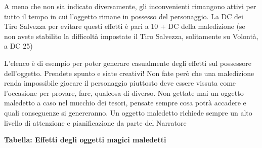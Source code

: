 \begin{multicols}{2}
A meno che non sia indicato diversamente, gli inconvenienti rimangono attivi per tutto il tempo in cui l'oggetto rimane in possesso del personaggio. La DC dei Tiro Salvezza per evitare questi effetti è pari a 10 + DC della maledizione (se non avete stabilito la difficoltà impostate il Tiro Salvezza, solitamente su Volontà, a DC 25)

\end{multicols}

\medskip

\begin{changemargin}{0.3cm}{0.3cm}\begin{narratore}L'elenco è di esempio per poter generare casualmente degli effetti sul possessore dell'oggetto. Prendete spunto e siate creativi!  Non fate però che una maledizione renda impossibile giocare il personaggio piuttosto deve essere vissuta come l'occasione per provare, fare, qualcosa di diverso. Non gettate mai un oggetto maledetto a caso nel mucchio dei tesori, pensate sempre cosa potrà accadere e quali conseguenze si genereranno. Un oggetto maledetto richiede sempre un alto livello di attenzione e pianificazione da parte del Narratore\end{narratore}\end{changemargin}

\bigskip

\textbf{Tabella: Effetti degli oggetti magici maledetti}

\medskip

